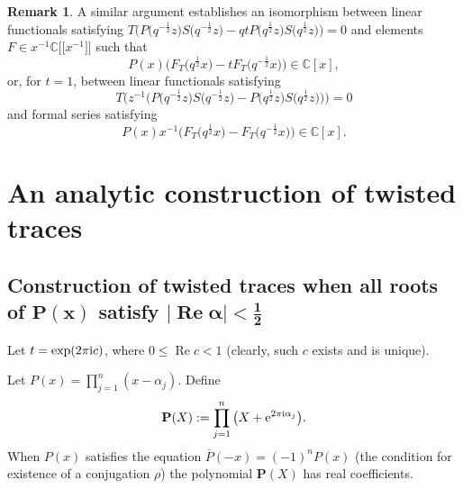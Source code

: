 \documentclass[pdftex]{sigma}
\newcommand{\CN}{\mathbb{C}} %
\newcommand{\ovl}{\overline}
\renewcommand{\Re}{\operatorname{Re}}
\newcommand{\bP}{\mathbf{P}}
\theoremstyle{definition}
\newtheorem{Remark}[Theorem]{Remark}
\numberwithin{equation}{section}
\begin{document}
\begin{Remark}
 A similar argument establishes an isomorphism between linear functionals
 satisfying $T\big(P\big(q^{-\frac{1}{2}}z\big)S\big(q^{-\frac{1}{2}}z\big)-qt P\big(q^{\frac{1}{2}}z\big)S\big(q^{\frac{1}{2}}z\big)\big)=0$ and
 elements $F\in x^{-1}\CN\big[\big[x^{-1}\big]\big]$ such that
 \[
 P(x)\big(F_T\big(q^{\frac{1}{2}}x\big)-t F_T\big(q^{-\frac{1}{2}}x\big)\big) \in \CN[x],
 \]
 or, for $t=1$, between linear functionals satisfying
 \[
 T\big(z^{-1}\big(P\big(q^{-\frac{1}{2}}z\big)S\big(q^{-\frac{1}{2}}z\big)
 -P\big(q^{\frac{1}{2}}z\big)S\big(q^{\frac{1}{2}}z\big)\big)\big)=0
 \]
 and formal series satisfying
 \[
 P(x) x^{-1}\big(F_T\big(q^{\frac{1}{2}}x\big)-F_T\big(q^{-\frac{1}{2}}x\big)\big)\in \CN[x].
 \]
\end{Remark}

\section{An analytic construction of twisted traces}\label{sec3}

\subsection[Construction of twisted traces when all roots of P(x) satisfy |Re alpha|<1/2]
{Construction of twisted traces when all roots of $\boldsymbol{P(x)}$ satisfy $\boldsymbol{|\Re\alpha|<\frac{1}{2}}$}
Let $t=\exp(2\pi {\rm i} c)$, where $0\le \Re c<1$ (clearly, such $c$ exists and is unique).

Let $P(x)=\prod_{j=1}^n(x-\alpha_j)$. Define
\[
\bP(X):=\prod_{j=1}^n\big(X+{\rm e}^{2\pi {\rm i}\alpha_j}\big).
\]
 When $P(x)$ satisfies the equation $\ovl{P}(-x)=(-1)^nP(x)$
 (the condition for existence of a conjugation $\rho$) the polynomial $\bP(X)$ has real coefficients.
\end{document}
